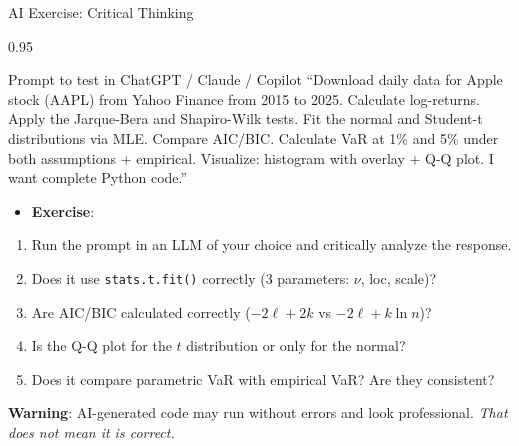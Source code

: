 \documentclass[9pt, aspectratio=169, t]{beamer}
\begin{document}
\begin{frame}{AI Exercise: Critical Thinking}
\begin{cminipage}{0.95\textwidth}
    \vspace{-3mm}
    \begin{block}{\footnotesize Prompt to test in ChatGPT / Claude / Copilot}
        {\footnotesize
        ``Download daily data for Apple stock (AAPL) from Yahoo Finance from 2015 to 2025. Calculate log-returns. Apply the Jarque-Bera and Shapiro-Wilk tests. Fit the normal and Student-t distributions via MLE. Compare AIC/BIC. Calculate VaR at 1\% and 5\% under both assumptions + empirical. Visualize: histogram with overlay + Q-Q plot. I want complete Python code.''
        }
    \end{block}
    \vspace{-2mm}
    {\footnotesize
    \begin{itemize}\setlength{\itemsep}{0pt}
        \item \textbf{Exercise}:
    \end{itemize}
    \begin{enumerate}\setlength{\itemsep}{0pt}
        \item Run the prompt in an LLM of your choice and critically analyze the response.
        \item Does it use \texttt{stats.t.fit()} correctly (3 parameters: $\nu$, loc, scale)?
        \item Are AIC/BIC calculated correctly ($-2\ell + 2k$ vs $-2\ell + k\ln n$)?
        \item Is the Q-Q plot for the $t$ distribution or only for the normal?
        \item Does it compare parametric VaR with empirical VaR? Are they consistent?
    \end{enumerate}
    }
    \vspace{-2mm}
    \begin{alertblock}{}
        {\footnotesize \textbf{Warning}: AI-generated code may run without errors and look professional. \textit{That does not mean it is correct.}}
    \end{alertblock}
\end{cminipage}
\end{frame}
\end{document}
